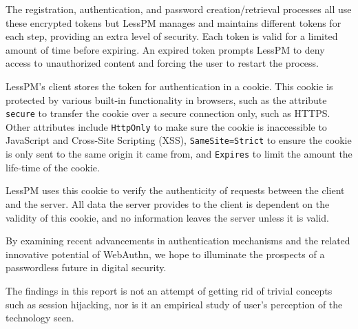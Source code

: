 The registration, authentication, and password creation/retrieval processes
all use these encrypted tokens but LessPM manages and maintains different
tokens for each step, providing an extra level of security.
Each token is valid for a limited amount of time before expiring.
An expired token prompts LessPM to deny access to unauthorized content and
forcing the user to restart the process.

LessPM's client stores the token for authentication in a cookie.
This cookie is protected by various built-in functionality in browsers, such as
the attribute \texttt{secure} to transfer the cookie over a secure connection
only, such as HTTPS\@.
Other attributes include \texttt{HttpOnly} to make sure the cookie is
inaccessible to JavaScript and Cross-Site Scripting (XSS),
\texttt{SameSite=Strict} to ensure the cookie is only sent to the same origin
it came from, and \texttt{Expires} to limit the amount the life-time of the
cookie.

LessPM uses this cookie to verify the authenticity of requests between the
client and the server.
All data the server provides to the client is dependent on the validity of
this cookie, and no information leaves the server unless it is valid.

By examining recent advancements in authentication mechanisms and the related
innovative potential of WebAuthn, we hope to illuminate the prospects of a
passwordless future in digital security.

The findings in this report is not an attempt of getting rid of trivial
concepts such as session hijacking, nor is it an empirical study of user's
perception of the technology seen.
